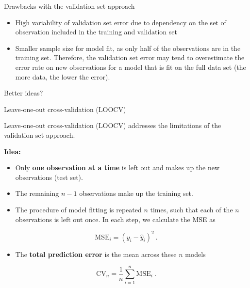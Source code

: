 \documentclass[10pt,ignorenonframetext,]{beamer}
\providecommand{\tightlist}{%
  \setlength{\itemsep}{0pt}\setlength{\parskip}{0pt}}
\begin{document}
\begin{frame}

\begin{block}{Drawbacks with the validation set approach}

\vspace{2mm}

\begin{itemize}
\item
  High variability of validation set error due to dependency on the set
  of observation included in the training and validation set
\item
  Smaller sample size for model fit, as only half of the observations
  are in the training set. Therefore, the validation set error may tend
  to overestimate the error rate on new observations for a model that is
  fit on the full data set (the more data, the lower the error).
\end{itemize}

\end{block}

\end{frame}

\begin{frame}

Better ideas?

\end{frame}

\begin{frame}

\begin{block}{Leave-one-out cross-validation (LOOCV)}

Leave-one-out cross-validation (LOOCV) addresses the limitations of the
validation set approach.

\vspace{2mm}

\textbf{Idea:}

\begin{itemize}
\tightlist
\item
  Only \textbf{one observation at a time} is left out and makes up the
  new observations (test set).
\item
  The remaining \(n-1\) observations make up the training set.
\item
  The procedure of model fitting is repeated \(n\) times, such that each
  of the \(n\) observations is left out once. In each step, we calculate
  the MSE as
\end{itemize}

\[\text{MSE}_i=(y_i-\hat{y}_i)^2 \ .\]

\begin{itemize}
\tightlist
\item
  The \textbf{total prediction error} is the mean across these \(n\)
  models
\end{itemize}

\[\text{CV}_{n}=\frac{1}{n}\sum_{i=1}^n \text{MSE}_i \ .\]

\end{block}

\end{frame}
\end{document}
